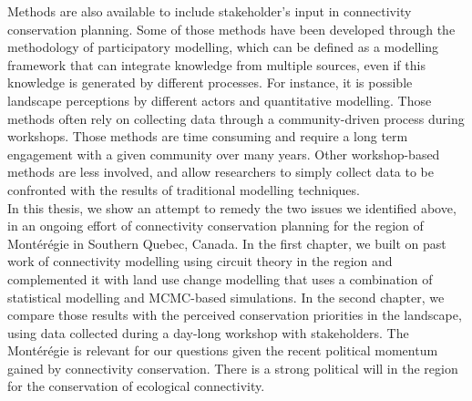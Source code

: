 \documentclass[12pt,Bold,TexShade]{mcgilletdclass}
\begin{document}
{Methods are also available to include stakeholder’s input in connectivity conservation planning. Some of those methods have been developed through the methodology of participatory modelling, which can be defined as a modelling framework that can integrate knowledge from multiple sources, even if this knowledge is generated by different processes. For instance, it is possible landscape perceptions by different actors and quantitative modelling. Those methods often rely on collecting data through a community-driven process during workshops. Those methods are time consuming and require a long term engagement with a given community over many years. Other workshop-based methods are less involved, and allow researchers to simply collect data to be confronted with the results of traditional modelling techniques.\\

In this thesis, we show an attempt to remedy the two issues we identified above,  in an ongoing effort of connectivity conservation planning for the region of Montérégie in Southern Quebec, Canada. In the first chapter, we built on past work of connectivity modelling using circuit theory in the region and complemented it with land use change modelling that uses a combination of statistical modelling and MCMC-based simulations. In the second chapter, we compare those results with the perceived conservation priorities in the landscape, using data collected during a day-long workshop with stakeholders. The Montérégie is relevant for our questions given the recent political momentum gained by connectivity conservation. There is a strong political will in the region for the conservation of ecological connectivity.
}%
\Intro



\Link



% 
%
%
\Link%

%


%
\printbibliography[heading=bibintoc, title={Bibliography \hspace{1em}}]
\end{document}
